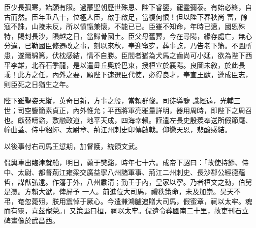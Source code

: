 \begin{pinyinscope}
 臣少長孤寒，始願有限。過蒙聖朝歷世殊恩、陛下睿鑒，寵靈彌泰。有始必終，自古而然。臣年垂八十，位極人臣，啟手啟足，當復何恨！但以陛下春秋尚
 富，餘寇不誅，山陵未反，所以憤愾兼懷，不能已已。臣雖不知命，年時已邁，國恩殊特，賜封長沙，隕越之日，當歸骨國土。臣父母舊葬，今在尋陽，緣存處亡，無心分違，已勒國臣修遷改之事，刻以來秋，奉迎窀穸，葬事訖，乃告老下籓。不圖所患，遂爾綿篤，伏枕感結，情不自勝。臣間者猶為犬馬之齒尚可小延，欲為陛下西平李雄，北吞石季龍，是以遣毌丘奧於巴東，授桓宣於襄陽。良圖未敘，於此長乖！此方之任，內外之要，願陛下速選臣代使，必得良才，奉宣王猷，遵成臣志，則臣死之日猶生之年。



 陛下雖聖姿天縱，英奇日新，方事之殷，當賴群俊。司徒導鑒
 識經遠，光輔三世；司空鑒簡素貞正，內外惟允；平西將軍亮雅量詳明，器用周時，即陛下之周召也。獻替疇諮，敷融政道，地平天成，四海幸賴。謹遣左長史殷羨奉送所假節麾、幢曲蓋、侍中貂蟬、太尉章、荊江州刺史印傳啟戟。仰戀天恩，悲酸感結。



 以後事付右司馬王愆期，加督護，統領文武。



 侃輿車出臨津就船，明日，薨于樊谿，時年七十六。成帝下詔曰：「故使持節、侍中、太尉、都督荊江雍梁交廣益寧八州諸軍事、荊江二州刺史、長沙郡公經德蘊哲，謀猷弘遠。作籓于外，八州肅清；勤王于內，皇家以寧。乃者桓文之勳，伯舅是憑。方賴大猷，俾屏予
 一人。前進位大司馬，禮秩策命，未及加崇。昊天不弔，奄忽薨殂，朕用震悼于厥心。今遣兼鴻臚追贈大司馬，假蜜章，祠以太牢。魂而有靈，喜茲寵榮。」又策謚曰桓，祠以太牢。侃遺令葬國南二十里，故吏刊石立碑畫像於武昌西。




\end{pinyinscope}
